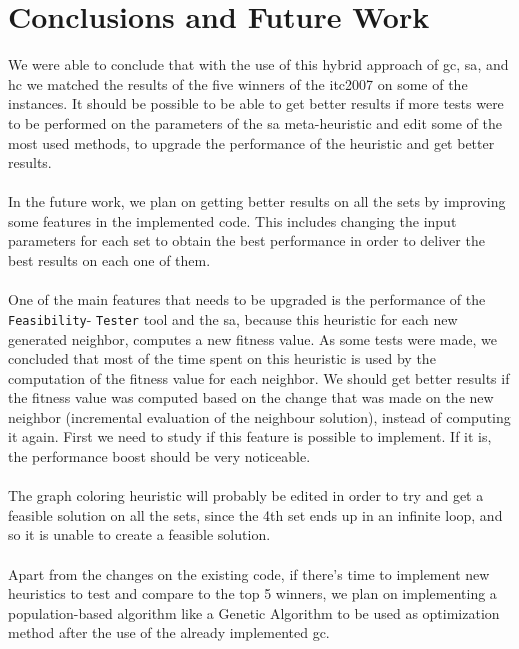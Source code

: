 \chapter{Conclusions and Future Work}
\label{chap:FutureWork}

We were able to conclude that with the use of this hybrid approach of \gls{gc}, \gls{sa}, and \gls{hc} we matched the results of the five winners of the \gls{itc2007} on some of the instances. It should be possible to be able to get better results if more tests were to be performed on the parameters of the \gls{sa} meta-heuristic and edit some of the most used methods, to upgrade the performance of the heuristic and get better results.\\
\\
In the future work, we plan on getting better results on all the sets by improving some features in the implemented code. This includes changing the input parameters for each set to obtain the best performance in order to deliver the best results on each one of them.\\
\\
One of the main features that needs to be upgraded is the performance of the \verb+Feasibility+- \verb+Tester+ tool and the \gls{sa}, because this heuristic for each new generated neighbor, computes a new fitness value. As some tests were made, we concluded that most of the time spent on this heuristic is used by the computation of the fitness value for each neighbor. We should get better results if the fitness value was computed based on the change that was made on the new neighbor (incremental evaluation of the neighbour solution), instead of computing it again. First we need to study if this feature is possible to implement. If it is, the performance boost should be very noticeable.\\
\\
The graph coloring heuristic will probably be edited in order to try and get a feasible solution on all the sets, since the 4th set ends up in an infinite loop, and so it is unable to create a feasible solution.\\
\\
Apart from the changes on the existing code, if there's time to implement new heuristics to test and compare to the top 5 winners, we plan on implementing a population-based algorithm like a Genetic Algorithm to be used as optimization method after the use of the already implemented \gls{gc}.